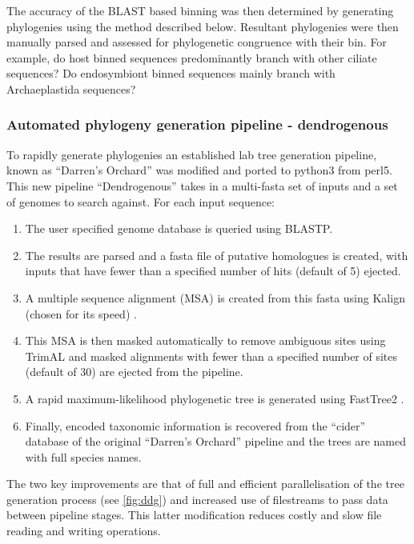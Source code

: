 The accuracy of the BLAST based binning was then determined by generating phylogenies
using the method described below. Resultant phylogenies were then manually
parsed and assessed for phylogenetic congruence with their bin.
For example, do host binned sequences predominantly branch with other ciliate sequences?
Do endosymbiont binned sequences mainly branch with Archaeplastida sequences?

\subsubsection{Automated phylogeny generation pipeline - dendrogenous}

To rapidly generate phylogenies an established lab tree generation pipeline, known as ``Darren's Orchard'' 
\citep{Richards2009g} was modified and ported to python3 from perl5.  This new pipeline ``Dendrogenous'' 
takes in a multi-fasta set of inputs and a set of genomes to search against.
For each input sequence:
\begin{enumerate} 
    \item The user specified genome database is queried using BLASTP.
    \item The results are parsed and a fasta file of putative homologues is created, with inputs that have fewer than a specified 
        number of hits (default of 5) ejected.
    \item A multiple sequence alignment (MSA) is created from this fasta using Kalign (chosen for its speed) \citep{Lassmann2009}.
    \item This MSA is then masked automatically to remove ambiguous sites using TrimAL \citep{Capella-Gutierrez2009} and masked alignments
        with fewer than a specified number of sites (default of 30) are ejected from the pipeline.
    \item A rapid maximum-likelihood phylogenetic tree is generated using FastTree2 \citep{Price2010}.
    \item Finally, encoded taxonomic information is recovered from the ``cider'' database of the original ``Darren's Orchard'' pipeline 
        and the trees are named with full species names.
\end{enumerate}
The two key improvements are that of full and efficient parallelisation of the tree generation process (see \cref{fig:ddg})
and increased use of filestreams to pass data between pipeline stages.  This latter modification reduces costly and slow
file reading and writing operations.

